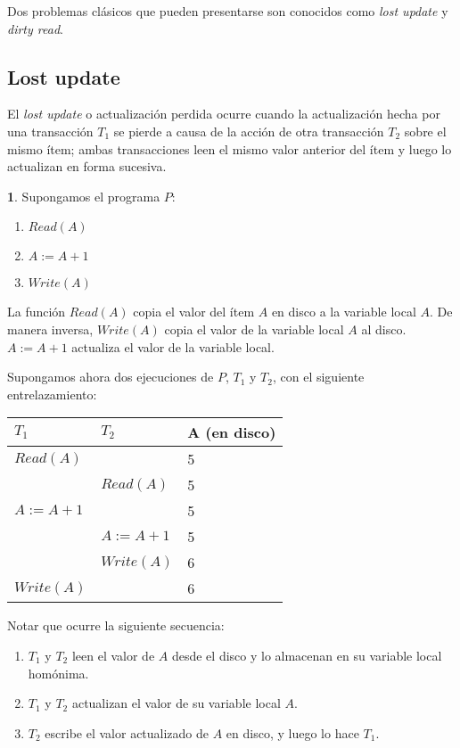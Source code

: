 \documentclass[english]{article}
\theoremstyle{definition}
\theoremstyle{definition}
\newtheorem{example}[thm]{\protect\examplename}
\providecommand{\examplename}{Ejemplo}
\begin{document}
Dos problemas clásicos que pueden presentarse son conocidos como \emph{lost
update} y \emph{dirty read}.

\subsection{Lost update}

El \emph{lost update} o actualización perdida ocurre cuando la actualización
hecha por una transacción $T_1$ se pierde a causa de la acción de otra
transacción $T_2$ sobre el mismo ítem; ambas transacciones leen el mismo valor
anterior del ítem y luego lo actualizan en forma sucesiva.

\begin{example}
Supongamos el programa $P$:
\begin{enumerate}
    \item $Read(A)$
    \item $A := A + 1$
    \item $Write(A)$
\end{enumerate}

La función $Read(A)$ copia el valor del ítem $A$ en disco a la variable local
$A$. De manera inversa, $Write(A)$ copia el valor de la variable local $A$ al
disco. $A := A + 1$ actualiza el valor de la variable local.

Supongamos ahora dos ejecuciones de $P$, $T_1$ y $T_2$, con el siguiente
entrelazamiento:

\vspace{10pt}

\begin{tabular}{ l l l }
  $T_1$         & $T_2$         & A (en disco)  \\
  \hline
  $Read(A)$     &               & 5             \\
                & $Read(A)$     & 5             \\
  $A := A + 1$  &               & 5             \\
                & $A := A + 1$  & 5             \\
                & $Write(A)$    & 6             \\
  $Write(A)$    &               & 6             \\
\end{tabular}

\vspace{10pt}

Notar que ocurre la siguiente secuencia:
\begin{enumerate}
    \item $T_1$ y $T_2$ leen el valor de $A$ desde el disco y lo almacenan en
        su variable local homónima.
    \item $T_1$ y $T_2$ actualizan el valor de su variable local $A$.
    \item $T_2$ escribe el valor actualizado de $A$ en disco, y luego lo hace
        $T_1$.
\end{enumerate}


\end{example}
\end{document}
